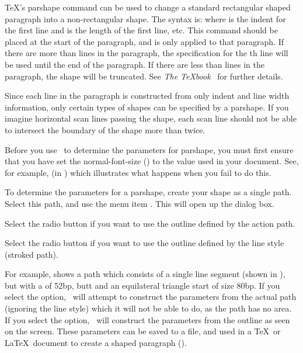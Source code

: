 
\TeX's \gls{parshape} command can be used to change a
standard rectangular shaped paragraph into a non-rectangular
shape. The syntax is:
where  is the indent for
the first line and  is
the length of the first line, etc.  This command should be placed at
the start of the paragraph, and is only applied to that paragraph.
If there are more than  lines in the
paragraph, the specification for the th
line will be used until the end of the paragraph. If there are less
than  lines in the paragraph, the shape
will be truncated. See \emph{The \TeX{}book}~\cite{Knuth} for further
details.

Since each line in the paragraph is constructed from only indent and
line width information, only certain types of shapes can be
specified by a \gls{parshape}. If you imagine horizontal
scan lines passing  the shape, each scan line should not
be able to intersect the boundary of the shape more than twice.

Before you use \FlowframTk\ to determine the parameters for
\gls{parshape}, you must first ensure that you have set the
\gls{normal-font-size} () to the value
used in your document. See, for example,  (in
) which illustrates what happens when
you fail to do this.


To determine the parameters for a \gls{parshape}, create your shape
as a single \gls{path}. Select this \gls*{path}, and use the menu
item .  This will open up the  dialog box.


Select the  radio button if you want to
use the outline defined by the action \gls{path}.


Select the  radio button if you want to
use the outline defined by the line style (stroked path).

For example,  shows a \gls*{path}
which consists of a single line segment (shown in
), but with a
 of 52\gls{bp}, butt
 and an equilateral triangle
start  of size 80bp.  If you
select the  option, \FlowframTk\
will attempt to construct the parameters from the actual \gls*{path}
(ignoring the line style) which it will not be able to do, as the
\gls*{path} has no area. If you select the
 option, \FlowframTk\ will
construct the parameters from the outline as seen on the screen.
These parameters can be saved to a file, and used in a \TeX\ or
\LaTeX\ document to create a shaped paragraph
().

